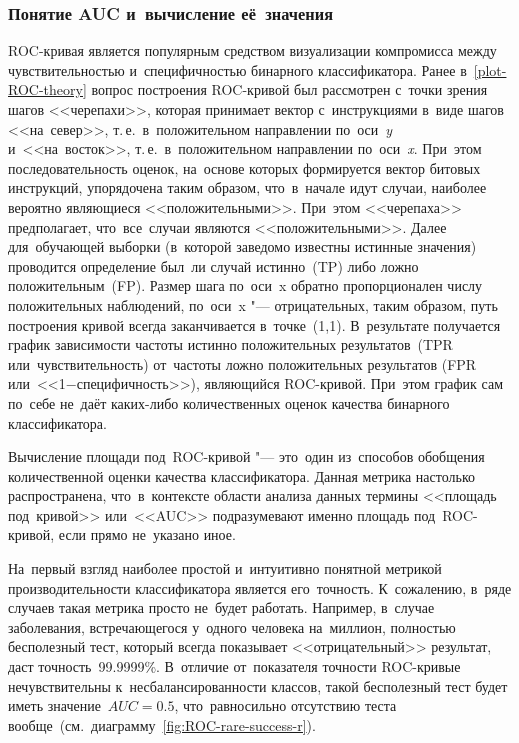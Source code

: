 \documentclass[]{scrreprt}
\begin{document}
\subsubsection{Понятие AUC и~вычисление её~значения}\label{calculate-AUC-theory}
ROC-кривая является популярным средством визуализации компромисса между чувствительностью и~специфичностью бинарного классификатора. Ранее в~\ref{plot-ROC-theory} вопрос построения ROC-кривой был рассмотрен с~точки зрения шагов <<черепахи>>, которая принимает вектор с~инструкциями в~виде шагов <<на~север>>, т.\,е.~в~положительном направлении по~оси~\textit{y} и~<<на~восток>>, т.\,е.~в~положительном направлении по~оси~\textit{x}. При~этом последовательность оценок, на~основе которых формируется вектор битовых инструкций, упорядочена таким образом, что~в~начале идут случаи, наиболее вероятно являющиеся <<положительными>>. При~этом <<черепаха>> предполагает, что~все~случаи являются <<положительными>>. Далее для~обучающей выборки (в~которой заведомо известны истинные значения) проводится определение был~ли случай истинно~(TP) либо ложно положительным~(FP). Размер шага по~оси~x обратно пропорционален числу положительных наблюдений, по~оси~x "--- отрицательных, таким образом, путь построения кривой всегда заканчивается в~точке~(1,1). В~результате получается график зависимости частоты истинно положительных результатов~(TPR или~чувствительность) от~частоты ложно положительных результатов (FPR или~<<1$-$специфичность>>), являющийся ROC-кривой. При~этом график сам по~себе не~даёт каких-либо количественных оценок качества бинарного классификатора.

Вычисление площади под~ROC-кривой "--- это~один из~способов обобщения количественной оценки качества классификатора. Данная метрика настолько распространена, что~в~контексте области анализа данных термины <<площадь под~кривой>> или~<<AUC>> подразумевают именно площадь под~ROC-кривой, если прямо не~указано иное.

На~первый взгляд наиболее простой и~интуитивно понятной метрикой производительности классификатора является его~точность. К~сожалению, в~ряде случаев такая метрика просто не~будет работать. Например, в~случае заболевания, встречающегося у~одного человека на~миллион, полностью бесполезный тест, который всегда показывает <<отрицательный>> результат, даст точность~99.9999\%. В~отличие от~показателя точности ROC-кривые нечувствительны к~несбалансированности классов, такой бесполезный тест будет иметь значение~$AUC=0.5$, что~равносильно отсутствию теста вообще~(см.~диаграмму~\ref{fig:ROC-rare-success-r}).
\end{document}
